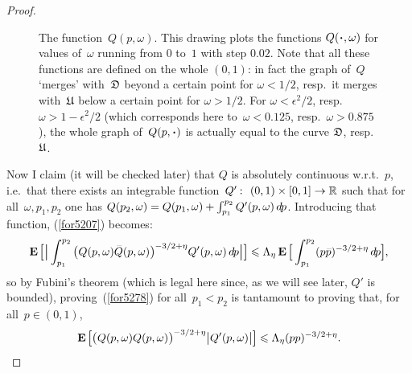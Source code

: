 \begin{proof}
\begin{figure}
\begin{tikzpicture}[x=5.25cm,y=5.25cm,>=stealth,line cap=round]
\end{tikzpicture}
%
\caption{The function~$Q(p,\omega)$. This drawing plots the functions $Q(\protect\Bcdot,\omega)$
for values of~$\omega$ running from $0$ to~$1$ with step $0.02$.
Note that all these functions are defined on the whole $(0,1)$:
in fact the graph of~$Q$ `merges' with~$\mathfrak{D}$ beyond a certain point for $\omega<1/2$,
resp.\ it merges with~$\mathfrak{U}$ below a certain point for $\omega>1/2$.
For $\omega<\epsilon^2/2$, resp.\ $\omega>1-\epsilon^2/2$ (which corresponds here to~$\omega<0.125$, resp.\ $\omega>0.875$),
the whole graph of~$Q(p,\protect\Bcdot)$ is actually equal to the curve $\mathfrak{D}$, resp.~$\mathfrak{U}$.}\label{fig-Q}
%
\end{figure}

Now I claim (it will be checked later) that $Q$ is absolutely continuous w.r.t.~$p$,
i.e.\ that there exists an integrable function~$Q' \colon (0,1)\times[0,1] \to \RR$
such that for all~$\omega,p_1,p_2$ one has $Q(p_2,\omega) = Q(p_1,\omega) + \int_{p_1}^{p_2} Q'(p,\omega) \,\dx{p}$.
Introducing that function, (\ref{for5207}) becomes:
\[\label{for5278} \EE\Big[ \Big| \int_{p_1}^{p_2} \big(Q(p,\omega)\bar{Q}(p,\omega)\big)^{-3/2+\eta} Q'(p,\omega) \,\dx{p} \Big| \Big]
\leq \Lambda_{\eta} \EE\Big[ \int_{p_1}^{p_2} (p\bar{p})^{-3/2+\eta} \,\dx{p} \Big] ,\]
so by Fubini's theorem (which is legal here since, as we will see later, $Q'$ is bounded),
proving~(\ref{for5278}) for all~$p_1<p_2$ is tantamount to proving that, for all~$p\in(0,1)$,
\[\label{for5278b} \EE \Big[ \big(Q(p,\omega)\bar{Q}(p,\omega)\big)^{-3/2+\eta} \big|Q'(p,\omega)\big| \Big]
\leq \Lambda_{\eta} (p\bar{p})^{-3/2+\eta} .\]


\end{proof}
